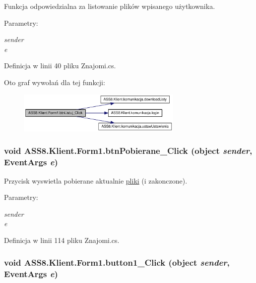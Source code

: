 Funkcja odpowiedzialna za listowanie plików wpisanego użytkownika. 

\begin{Desc}
\item[Parametry:]
\begin{description}
\item[{\em sender}]\item[{\em e}]\end{description}
\end{Desc}


Definicja w linii 40 pliku Znajomi.cs.

Oto graf wywołań dla tej funkcji:\nopagebreak
\begin{figure}[H]
\begin{center}
\leavevmode
\includegraphics[width=226pt]{d1/d7c/a00003_e934f222567288447b30be318da95ba7_cgraph}
\end{center}
\end{figure}
\hypertarget{a00003_1fb4fa2454ffdf753cce1637657029c8}{
\subsubsection[{btnPobierane\_\-Click}]{\setlength{\rightskip}{0pt plus 5cm}void ASS8.Klient.Form1.btnPobierane\_\-Click (object {\em sender}, \/  EventArgs {\em e})}}
\label{d1/d7c/a00003_1fb4fa2454ffdf753cce1637657029c8}


Przycisk wyswietla pobierane aktualnie \hyperlink{a00017}{pliki} (i zakonczone). 

\begin{Desc}
\item[Parametry:]
\begin{description}
\item[{\em sender}]\item[{\em e}]\end{description}
\end{Desc}


Definicja w linii 114 pliku Znajomi.cs.\hypertarget{a00003_3565ea2384b6428312fa310aad4c7e25}{
\subsubsection[{button1\_\-Click}]{\setlength{\rightskip}{0pt plus 5cm}void ASS8.Klient.Form1.button1\_\-Click (object {\em sender}, \/  EventArgs {\em e})}}
\label{d1/d7c/a00003_3565ea2384b6428312fa310aad4c7e25}


